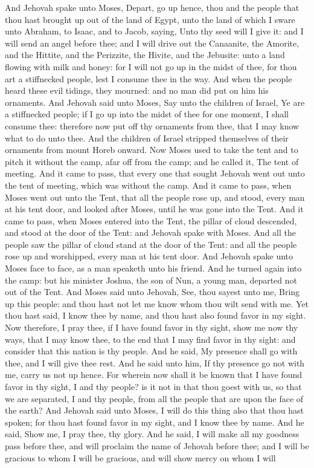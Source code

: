 And Jehovah spake unto Moses, Depart, go up hence, thou and the people that thou hast brought up out of the land of Egypt, unto the land of which I sware unto Abraham, to Isaac, and to Jacob, saying, Unto thy seed will I give it: and I will send an angel before thee; and I will drive out the Canaanite, the Amorite, and the Hittite, and the Perizzite, the Hivite, and the Jebusite: unto a land flowing with milk and honey: for I will not go up in the midst of thee, for thou art a stiffnecked people, lest I consume thee in the way. And when the people heard these evil tidings, they mourned: and no man did put on him his ornaments. And Jehovah said unto Moses, Say unto the children of Israel, Ye are a stiffnecked people; if I go up into the midst of thee for one moment, I shall consume thee: therefore now put off thy ornaments from thee, that I may know what to do unto thee. And the children of Israel stripped themselves of their ornaments from mount Horeb onward.  Now Moses used to take the tent and to pitch it without the camp, afar off from the camp; and he called it, The tent of meeting. And it came to pass, that every one that sought Jehovah went out unto the tent of meeting, which was without the camp. And it came to pass, when Moses went out unto the Tent, that all the people rose up, and stood, every man at his tent door, and looked after Moses, until he was gone into the Tent. And it came to pass, when Moses entered into the Tent, the pillar of cloud descended, and stood at the door of the Tent: and Jehovah spake with Moses. And all the people saw the pillar of cloud stand at the door of the Tent: and all the people rose up and worshipped, every man at his tent door. And Jehovah spake unto Moses face to face, as a man speaketh unto his friend. And he turned again into the camp: but his minister Joshua, the son of Nun, a young man, departed not out of the Tent.  And Moses said unto Jehovah, See, thou sayest unto me, Bring up this people: and thou hast not let me know whom thou wilt send with me. Yet thou hast said, I know thee by name, and thou hast also found favor in my sight. Now therefore, I pray thee, if I have found favor in thy sight, show me now thy ways, that I may know thee, to the end that I may find favor in thy sight: and consider that this nation is thy people. And he said, My presence shall go with thee, and I will give thee rest. And he said unto him, If thy presence go not with me, carry us not up hence. For wherein now shall it be known that I have found favor in thy sight, I and thy people? is it not in that thou goest with us, so that we are separated, I and thy people, from all the people that are upon the face of the earth?  And Jehovah said unto Moses, I will do this thing also that thou hast spoken; for thou hast found favor in my sight, and I know thee by name. And he said, Show me, I pray thee, thy glory. And he said, I will make all my goodness pass before thee, and will proclaim the name of Jehovah before thee; and I will be gracious to whom I will be gracious, and will show mercy on whom I will 